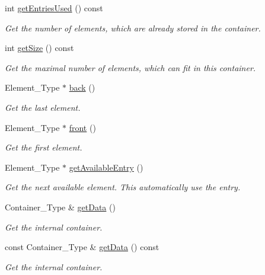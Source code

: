 \begin{DoxyCompactItemize}
int \mbox{\hyperlink{classr3_1_1_fixed_size_container_a4ec349530e78e78244f739139ed58b49}{get\+Entries\+Used}} () const
\begin{DoxyCompactList}\small\item\em Get the number of elements, which are already stored in the container. \end{DoxyCompactList}\item 
int \mbox{\hyperlink{classr3_1_1_fixed_size_container_a984b90ac15df32a41011e665e3059e17}{get\+Size}} () const
\begin{DoxyCompactList}\small\item\em Get the maximal number of elements, which can fit in this container. \end{DoxyCompactList}\item 
Element\+\_\+\+Type $\ast$ \mbox{\hyperlink{classr3_1_1_fixed_size_container_a6e849d08e5ad5a1a0ef6207f8b36b22e}{back}} ()
\begin{DoxyCompactList}\small\item\em Get the last element. \end{DoxyCompactList}\item 
Element\+\_\+\+Type $\ast$ \mbox{\hyperlink{classr3_1_1_fixed_size_container_ae60eda032ed2276552c7df4fc6da4640}{front}} ()
\begin{DoxyCompactList}\small\item\em Get the first element. \end{DoxyCompactList}\item 
Element\+\_\+\+Type $\ast$ \mbox{\hyperlink{classr3_1_1_fixed_size_container_a7903fc6d43600195b97218aead60a99a}{get\+Available\+Entry}} ()
\begin{DoxyCompactList}\small\item\em Get the next available element. This automatically use the entry. \end{DoxyCompactList}\item 
Container\+\_\+\+Type \& \mbox{\hyperlink{classr3_1_1_fixed_size_container_adbf383734c597677d4221278000886a3}{get\+Data}} ()
\begin{DoxyCompactList}\small\item\em Get the internal container. \end{DoxyCompactList}\item 
const Container\+\_\+\+Type \& \mbox{\hyperlink{classr3_1_1_fixed_size_container_acd837bc4730c98aa4346819726620842}{get\+Data}} () const
\begin{DoxyCompactList}\small\item\em Get the internal container. \end{DoxyCompactList}\end{DoxyCompactItemize}


